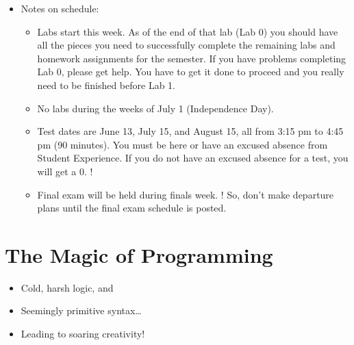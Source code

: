 \documentclass[letterpaper,10pt,english]{sphinxmanual}
\begin{document}
\begin{itemize}
\item {} 
Notes on schedule:
\begin{itemize}
\item {} 
Labs start this week. As of the end of that lab (Lab 0) you should
have all the pieces you need to successfully complete
the remaining labs and homework assignments for the semester. If you have problems
completing Lab 0, please get help. You have to get it done to proceed and you really need to be
finished before Lab 1.

\item {} 
No labs during the weeks of July 1 (Independence Day).

\item {} 
Test dates are June 13, July 15, and August 15, all from 3:15 pm to 4:45 pm (90 minutes). You must be here or have an excused absence from Student Experience. If you do not have an excused absence for a test, you will get a 0. !

\item {} 
Final exam will be held during finals week.  !  So,
don’t make departure plans until the final exam schedule is posted.

\end{itemize}

\end{itemize}


\section{The Magic of Programming}
\label{\detokenize{lecture_notes/lec01_intro:the-magic-of-programming}}\begin{itemize}
\item {} 
Cold, harsh logic, and

\item {} 
Seemingly primitive syntax…

\item {} 
Leading to soaring creativity!

\end{itemize}
\end{document}
